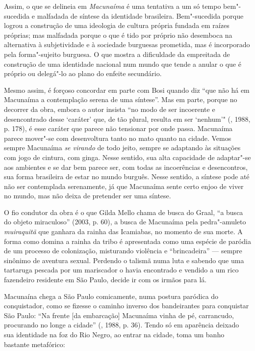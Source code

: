 Assim, o que se delineia em \emph{Macunaíma} é uma tentativa a um só
tempo bem"-sucedida e malfadada de síntese da identidade brasileira.
Bem"-sucedida porque logrou a construção de uma ideologia de cultura
própria fundada em raízes próprias; mas malfadada porque o que é tido
por próprio não desemboca na alternativa à subjetividade e à sociedade
burguesas prometida, mas é incorporado pela forma"-sujeito burguesa. O
que mostra a dificuldade da empreitada de construção de uma identidade
nacional num mundo que tende a anular o que é próprio ou delegá"-lo ao
plano do enfeite secundário.

Mesmo assim, é forçoso concordar em parte com Bosi quando diz ``que não
há em Macunaíma a contemplação serena de uma síntese''. Mas em parte, porque
no decorrer da obra, embora o autor insista ``no modo de ser incoerente
e desencontrado desse `caráter' que, de tão plural, resulta em ser
`nenhum'" (, 1988, p. 178), é esse caráter que parece não tensionar
por onde passa. Macunaíma parece mover"-se com desenvoltura tanto no mato
quanto na cidade. Vemos sempre Macunaíma \emph{se virando} de todo
jeito, sempre se adaptando às situações com jogo de cintura, com ginga.
Nesse sentido, sua alta capacidade de adaptar"-se aos ambientes e se dar
bem parece ser, com todas as incoerências e desencontros, sua forma
brasileira de estar no mundo burguês. Nesse sentido, a síntese pode até
não ser contemplada serenamente, já que Macunaíma sente certo enjoo de
viver no mundo, mas não deixa de pretender ser uma síntese.

O fio condutor da obra é o que Gilda Mello chama de busca do Graal, ``a
busca do objeto miraculoso'' (2003, p. 60), a busca de Macunaíma pela
pedra"-amuleto \emph{muiraquitã} que ganhara da rainha das Icamiabas, no
momento de sua morte. A forma como domina a rainha da tribo é
apresentada como uma espécie de paródia de um processo de colonização,
misturando violência e ``brincadeira'' --- sempre sinônimo de aventura
sexual. Perdendo o talismã numa luta e sabendo que uma tartaruga pescada
por um mariscador o havia encontrado e vendido a um rico fazendeiro
residente em São Paulo, decide ir com os irmãos para lá.

Macunaína chega a São Paulo comicamente, numa postura paródica do
conquistador, como se fizesse o caminho inverso dos bandeirantes para
conquistar São Paulo: ``Na frente [da embarcação] Macunaíma vinha de
pé, carrancudo, procurando no longe a cidade'' (, 1988, p. 36).
Tendo só em aparência deixado sua identidade na foz do Rio Negro, ao
entrar na cidade, toma um banho bastante metafórico:

